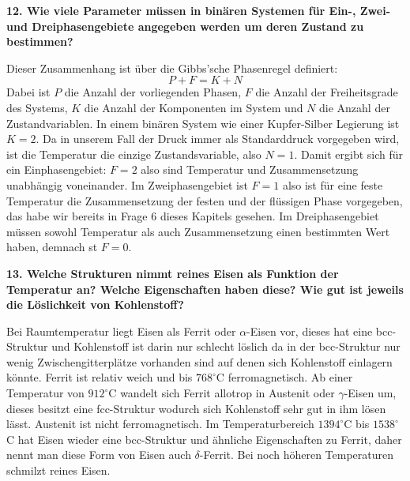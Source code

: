 \noindent\textbf{12. Wie viele Parameter müssen in binären Systemen für Ein-, Zwei- und Dreiphasengebiete angegeben werden um deren Zustand zu bestimmen?}\\
\begin{addmargin}[25pt]{0pt}
Dieser Zusammenhang ist über die Gibbs'sche Phasenregel definiert:
\begin{equation}\label{eq:Gibbs_Phasenregel}
    P + F = K + N
\end{equation}
Dabei ist $P$ die Anzahl der vorliegenden Phasen, $F$ die Anzahl der Freiheitsgrade des Systems, $K$ die Anzahl der Komponenten im System und $N$ die Anzahl der Zustandvariablen. In einem binären System wie einer Kupfer-Silber Legierung ist $K = 2$. Da in unserem Fall der Druck immer als Standarddruck vorgegeben wird, ist die Temperatur die einzige Zustandsvariable, also $N = 1$. Damit ergibt sich für ein Einphasengebiet: $F = 2$ also sind Temperatur und Zusammensetzung unabhängig voneinander. Im Zweiphasengebiet ist $F = 1$ also ist für eine feste Temperatur die Zusammensetzung der festen und der flüssigen Phase vorgegeben, das habe wir bereits in Frage 6 dieses Kapitels gesehen. Im Dreiphasengebiet müssen sowohl Temperatur als auch Zusammensetzung einen bestimmten Wert haben, demnach st $F = 0$.\\ 
\end{addmargin}

\noindent\textbf{13. Welche Strukturen nimmt reines Eisen als Funktion der Temperatur an? Welche Eigenschaften haben diese? Wie gut ist jeweils die Löslichkeit von Kohlenstoff?}\\
\begin{addmargin}[25pt]{0pt}
Bei Raumtemperatur liegt Eisen als Ferrit oder $\alpha$-Eisen vor, dieses hat eine bcc-Struktur und Kohlenstoff ist darin nur schlecht löslich da in der bcc-Struktur nur wenig Zwischengitterplätze vorhanden sind auf denen sich Kohlenstoff einlagern könnte. Ferrit ist relativ weich und bis $768^\circ $C ferromagnetisch. Ab einer Temperatur von $912^\circ$C wandelt sich Ferrit allotrop in Austenit oder $\gamma$-Eisen um, dieses besitzt eine fcc-Struktur wodurch sich Kohlenstoff sehr gut in ihm lösen lässt. Austenit ist nicht ferromagnetisch. Im Temperaturbereich $1394^\circ$C bis $1538^\circ$C hat Eisen wieder eine bcc-Struktur und ähnliche Eigenschaften zu Ferrit, daher nennt man diese Form von Eisen auch $\delta$-Ferrit. Bei noch höheren Temperaturen schmilzt reines Eisen.\\
\end{addmargin}

